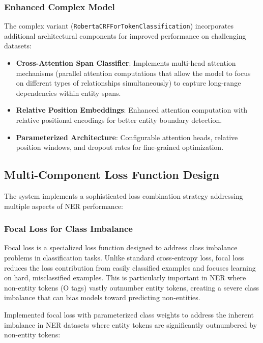 \documentclass[a4paper]{usiinfbachelorproject}
\begin{document}
\subsubsection{Enhanced Complex Model}

The complex variant (\texttt{RobertaCRFForTokenClassification}) incorporates additional architectural components for improved performance on challenging datasets:

\begin{itemize}
    \item \textbf{Cross-Attention Span Classifier}: Implements multi-head attention mechanisms (parallel attention computations that allow the model to focus on different types of relationships simultaneously) to capture long-range dependencies within entity spans.
    \item \textbf{Relative Position Embeddings}: Enhanced attention computation with relative positional encodings for better entity boundary detection.
    \item \textbf{Parameterized Architecture}: Configurable attention heads, relative position windows, and dropout rates for fine-grained optimization.
\end{itemize}

\subsection{Multi-Component Loss Function Design}

The system implements a sophisticated loss combination strategy addressing multiple aspects of NER performance:

\subsubsection{Focal Loss for Class Imbalance}

Focal loss is a specialized loss function designed to address class imbalance problems in classification tasks. Unlike standard cross-entropy loss, focal loss reduces the loss contribution from easily classified examples and focuses learning on hard, misclassified examples. This is particularly important in NER where non-entity tokens (O tags) vastly outnumber entity tokens, creating a severe class imbalance that can bias models toward predicting non-entities.

Implemented focal loss with parameterized class weights to address the inherent imbalance in NER datasets where entity tokens are significantly outnumbered by non-entity tokens:
\end{document}
